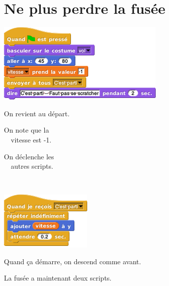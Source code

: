 \documentclass[a7paper,pagesize,DIV=14,10pt]{scrbook}
\begin{document}
\newpage

\section*{Ne plus perdre la fusée}
\vspace{-.8\baselineskip}

\begin{minipage}[b]{.53\linewidth}
  \includegraphics[scale=.5]{img/fusee_init.png}
\end{minipage}
\begin{minipage}[b]{.48\linewidth}
  \hspace{-2.5mm}On revient au départ.

  On note que la \\ 
  \null~~vitesse est -1.

  On déclenche les \\ 
  \null~~autres scripts.

  \vspace{.3\baselineskip}~
\end{minipage}


\begin{minipage}{.53\linewidth}
  \includegraphics[scale=.5]{img/fusee_descendre.png}
\end{minipage}
\begin{minipage}{.47\linewidth}
  Quand ça démarre, on descend comme avant.
\end{minipage}

La fusée a maintenant deux scripts.

\vspace{-.8\baselineskip}
\end{document}
